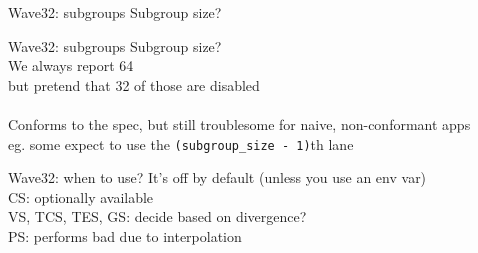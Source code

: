 \documentclass[aspectratio=169,t,xcolor=table]{beamer}
\begin{document}
\begin{frame}{Wave32: subgroups}
    \normalsize
    Subgroup size?
\end{frame}

\begin{frame}{Wave32: subgroups}
    \normalsize
    Subgroup size? \\
    \LARGE
    We always report 64 \\
    but pretend that 32 of those are disabled \\
    \ \\
    \normalsize
    Conforms to the spec, but still troublesome for naive, non-conformant apps \\
    eg. some expect to use the \texttt{(subgroup\_size - 1)}th lane
\end{frame}

\begin{frame}{Wave32: when to use?}
    \normalsize
    It's off by default (unless you use an env var) \\
    \LARGE
    CS: optionally available \\
    VS, TCS, TES, GS: decide based on divergence? \\
    PS: performs bad due to interpolation
\end{frame}
\end{document}
